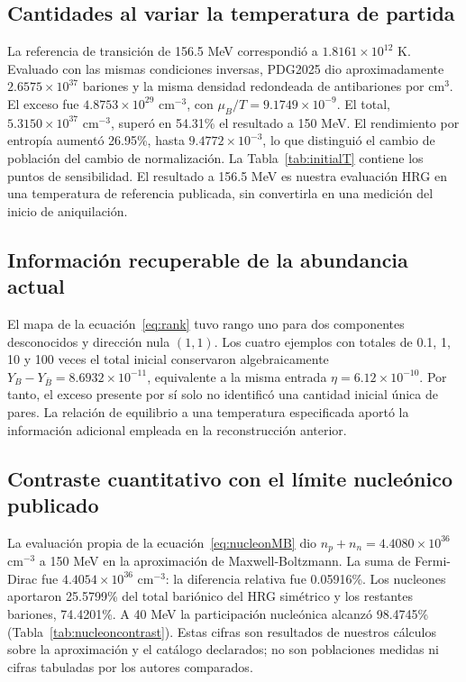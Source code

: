 \subsection{Cantidades al variar la temperatura de partida}
La referencia de transición de 156.5 MeV correspondió a $1.8161\times10^{12}$ K. Evaluado con las mismas condiciones inversas, PDG2025 dio aproximadamente $2.6575\times10^{37}$ bariones y la misma densidad redondeada de antibariones por cm$^3$. El exceso fue $4.8753\times10^{29}$ cm$^{-3}$, con $\mu_B/T=9.1749\times10^{-9}$. El total, $5.3150\times10^{37}$ cm$^{-3}$, superó en 54.31\% el resultado a 150 MeV. El rendimiento por entropía aumentó 26.95\%, hasta $9.4772\times10^{-3}$, lo que distinguió el cambio de población del cambio de normalización. La Tabla~\ref{tab:initialT} contiene los puntos de sensibilidad. El resultado a 156.5 MeV es nuestra evaluación HRG en una temperatura de referencia publicada, sin convertirla en una medición del inicio de aniquilación.



\subsection{Información recuperable de la abundancia actual}
El mapa de la ecuación~\eqref{eq:rank} tuvo rango uno para dos componentes desconocidos y dirección nula $(1,1)$. Los cuatro ejemplos con totales de 0.1, 1, 10 y 100 veces el total inicial conservaron algebraicamente $Y_B-Y_{\bar B}=8.6932\times10^{-11}$, equivalente a la misma entrada $\eta=6.12\times10^{-10}$. Por tanto, el exceso presente por sí solo no identificó una cantidad inicial única de pares. La relación de equilibrio a una temperatura especificada aportó la información adicional empleada en la reconstrucción anterior.

\subsection{Contraste cuantitativo con el límite nucleónico publicado}
La evaluación propia de la ecuación~\eqref{eq:nucleonMB} dio $n_p+n_n=4.4080\times10^{36}$ cm$^{-3}$ a 150 MeV en la aproximación de Maxwell-Boltzmann. La suma de Fermi-Dirac fue $4.4054\times10^{36}$ cm$^{-3}$: la diferencia relativa fue 0.05916\%. Los nucleones aportaron 25.5799\% del total bariónico del HRG simétrico y los restantes bariones, 74.4201\%. A 40 MeV la participación nucleónica alcanzó 98.4745\% (Tabla~\ref{tab:nucleoncontrast}). Estas cifras son resultados de nuestros cálculos sobre la aproximación y el catálogo declarados; no son poblaciones medidas ni cifras tabuladas por los autores comparados.

